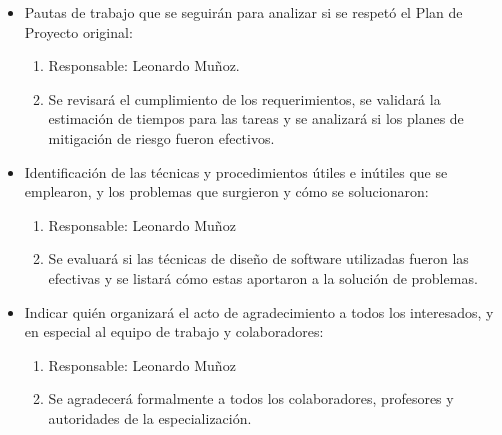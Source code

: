 \documentclass[
11pt, %
codirector, %
]{charter}
\begin{document}
\begin{itemize}
	\item Pautas de trabajo que se seguirán para analizar si se respetó el Plan de Proyecto original:
	
	\begin{enumerate}
	\item Responsable: Leonardo Muñoz.
	\item Se revisará el cumplimiento de los requerimientos, se validará la estimación de tiempos para las tareas y se analizará si los planes de mitigación de riesgo fueron efectivos.
	\end{enumerate}
	
	\item Identificación de las técnicas y procedimientos útiles e inútiles que se emplearon, y los problemas que surgieron y cómo se solucionaron:
	
	\begin{enumerate}
	\item Responsable: Leonardo Muñoz
	\item Se evaluará si las técnicas de diseño de software utilizadas fueron las efectivas y se listará cómo estas aportaron a la solución de problemas.
	\end{enumerate}
	
	 
	\item Indicar quién organizará el acto de agradecimiento a todos los interesados, y en especial al equipo de trabajo y colaboradores:
	\begin{enumerate}
	\item Responsable: Leonardo Muñoz
	\item Se agradecerá formalmente a todos los colaboradores, profesores y autoridades de la especialización.
	\end{enumerate}
	  
	  
\end{itemize}
\end{document}
